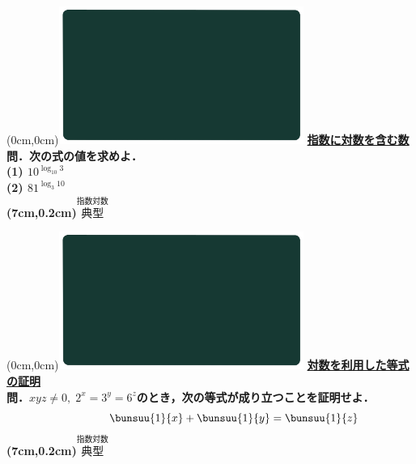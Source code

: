 \documentclass[10pt,
fleqn,
dvipdfmx,
uplatex
]{jsarticle}
\begin{document}
\newpage

\at(0cm,0cm){\includegraphics[width=8cm,bb=0 0 1920 1080]{./youtube/thumbnails/templates/smart_background/指数対数.jpeg}}
{\color{orange}\bf\boldmath\Large\underline{指数に対数を含む数}}\vspace{0.3zw}\\
\LARGE
\bf\boldmath 問．次の式の値を求めよ．\vspace{0.3zw}\\
(1)  ${10}^{\log _{{10}}3}$\\
(2)  ${81}^{\log _3{10}}$\\

\at(7cm,0.2cm){\small\color{bradorange}$\overset{\text{指数対数}}{\text{典型}}$}

\newpage

\at(0cm,0cm){\includegraphics[width=8cm,bb=0 0 1920 1080]{./youtube/thumbnails/templates/smart_background/指数対数.jpeg}}
{\color{orange}\bf\boldmath\Large\underline{対数を利用した等式の証明}}\vspace{0.3zw}\\
\Large 
\bf\boldmath 問．$xyz\neq 0,\;2^x=3^y=6^z$のとき，次の等式が成り立つことを証明せよ．\vspace{-0.5cm}
\[\hspace{1.5cm}\bunsuu{1}{x}+\bunsuu{1}{y}=\bunsuu{1}{z}\]
\at(7cm,0.2cm){\small\color{bradorange}$\overset{\text{指数対数}}{\text{典型}}$}

\newpage
\end{document}

